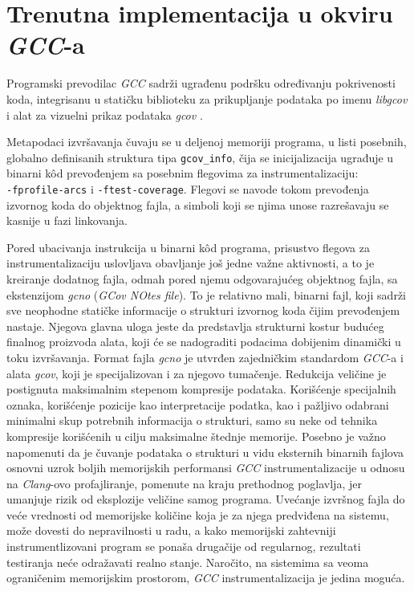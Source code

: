 \documentclass[12pt,oneside]{memoir}
\newcommand{\kod}[1]{\texttt{#1}}
\newcommand{\strano}[1]{\textit{#1}}
\begin{document}
\section{Trenutna implementacija u okviru \strano{GCC}-a}


Programski prevodilac \strano{GCC} sadrži ugrađenu podršku određivanju pokrivenosti koda, integrisanu u statičku biblioteku za prikupljanje podataka po imenu \strano{libgcov} i alat za vizuelni prikaz podataka \strano{gcov} \cite{GCOV, CodeCoverage}. 

Metapodaci izvršavanja čuvaju se u deljenoj memoriji programa, u listi posebnih, globalno definisanih struktura tipa \kod{gcov\_info}, čija se inicijalizacija ugrađuje u binarni k\^{o}d prevođenjem sa posebnim flegovima za instrumentalizaciju: \\  
\kod{-fprofile-arcs} i \kod{-ftest-coverage}. Flegovi se navode tokom prevođenja izvornog koda do objektnog fajla, a simboli koji se njima unose razrešavaju se kasnije u fazi linkovanja.  

Pored ubacivanja instrukcija u binarni k\^{o}d programa, prisustvo flegova za instrumentalizaciju uslovljava obavljanje još jedne važne aktivnosti, a to je kreiranje dodatnog fajla, odmah pored njemu odgovarajućeg objektnog fajla, sa ekstenzijom \strano{gcno} (\strano{GCov NOtes file}). To je relativno mali, binarni fajl, koji sadrži sve neophodne statičke informacije o strukturi izvornog koda čijim prevođenjem nastaje. Njegova glavna uloga jeste da predstavlja strukturni kostur budućeg finalnog proizvoda alata, koji će se nadograditi podacima dobijenim dinamički u toku izvršavanja. Format fajla \strano{gcno} je utvrđen zajedničkim standardom \strano{GCC}-a i alata \strano{gcov}, koji je specijalizovan i za njegovo tumačenje. Redukcija veličine je postignuta maksimalnim stepenom kompresije podataka. Korišćenje specijalnih oznaka, korišćenje pozicije kao interpretacije podatka, kao i pažljivo odabrani minimalni skup potrebnih informacija o strukturi, samo su neke od tehnika kompresije korišćenih u cilju maksimalne štednje memorije. Posebno je važno napomenuti da je čuvanje podataka o strukturi u vidu eksternih binarnih fajlova osnovni uzrok boljih memorijskih performansi \strano{GCC} instrumentalizacije u odnosu na \strano{Clang}-ovo profajliranje, pomenute na kraju prethodnog poglavlja, jer umanjuje rizik od eksplozije veličine samog programa.
Uvećanje izvršnog fajla do veće vrednosti od memorijske količine koja je za njega predviđena na sistemu, može dovesti do nepravilnosti u radu, a kako memorijski zahtevniji instrumentlizovani program se ponaša drugačije od regularnog, rezultati testiranja neće odražavati realno stanje. Naročito, na sistemima sa veoma ograničenim memorijskim prostorom, \strano{GCC} instrumentalizacija je jedina moguća.
\end{document}
